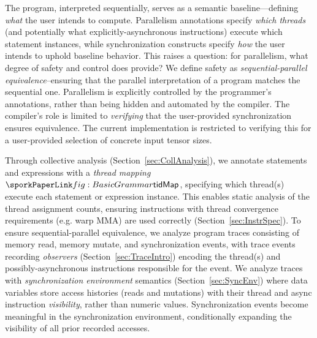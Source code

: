 The \sporkName{} program, interpreted sequentially, serves as a semantic baseline---defining \emph{what} the user intends to compute. Parallelism annotations specify \emph{which threads} (and potentially what explicitly-asynchronous instructions) execute which statement instances, while synchronization constructs specify \emph{how} the user intends to uphold baseline behavior.
This raises a question: for parallelism, what degree of safety and control does \sporkName{} provide?
We define safety as \emph{sequential-parallel equivalence}--ensuring that the parallel interpretation of a program matches the sequential one.
Parallelism is explicitly controlled by the programmer's annotations, rather than being hidden and automated by the compiler.
The \sporkName{} compiler's role is limited to \emph{verifying} that the user-provided synchronization ensures equivalence.
The current implementation is restricted to verifying this for a user-provided selection of concrete input tensor sizes.

Through collective analysis (Section~\ref{sec:CollAnalysis}), we annotate statements and expressions with a \emph{thread mapping} $\sporktidMap$, specifying which thread(s) execute each statement or expression instance.
This enables static analysis of the thread assignment counts, ensuring instructions with thread convergence requirements (e.g. warp MMA) are used correctly (Section~\ref{sec:InstrSpec}).
To ensure sequential-parallel equivalence, we analyze program traces consisting of memory read, memory mutate, and synchronization events, with trace events recording \emph{observers} (Section~\ref{sec:TraceIntro}) encoding the thread(s) and possibly-asynchronous instructions responsible for the event.
We analyze traces with \emph{synchronization environment} semantics (Section~\ref{sec:SyncEnv}) where data variables store access histories (reads and mutations) with their thread and async instruction \emph{visibility}, rather than numeric values.
Synchronization events become meaningful in the synchronization environment, conditionally expanding the visibility of all prior recorded accesses.

